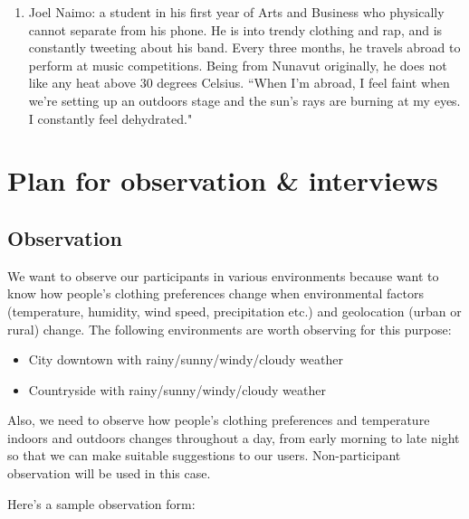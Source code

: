 \documentclass{sigchi}
\begin{document}
\begin{enumerate}
\item Joel Naimo: a student in his first year of Arts and Business who physically cannot separate from his phone. He is into trendy clothing and rap, and is constantly tweeting about his band. Every three months, he travels abroad to perform at music competitions. Being from Nunavut originally, he does not like any heat above 30 degrees Celsius. ``When I'm abroad, I feel faint when we're setting up an outdoors stage and the sun's rays are burning at my eyes. I constantly feel dehydrated."
\end{enumerate}

\section{Plan for observation \& interviews}
\subsection{Observation}
We want to observe our participants in various environments because want to know how people's clothing preferences change when environmental factors (temperature, humidity, wind speed, precipitation etc.) and geolocation (urban or rural) change. The following environments are worth observing for this purpose:
\begin{itemize}
    \item City downtown with rainy/sunny/windy/cloudy weather
    \item Countryside with  rainy/sunny/windy/cloudy weather
\end{itemize}
Also, we need to observe how people's clothing preferences and temperature indoors and outdoors changes throughout a day, from early morning to late night so that we can make suitable suggestions to our users. Non-participant observation will be used in this case. 

Here's a sample observation form:
\begin{table}[h]
\end{table}
\end{document}
